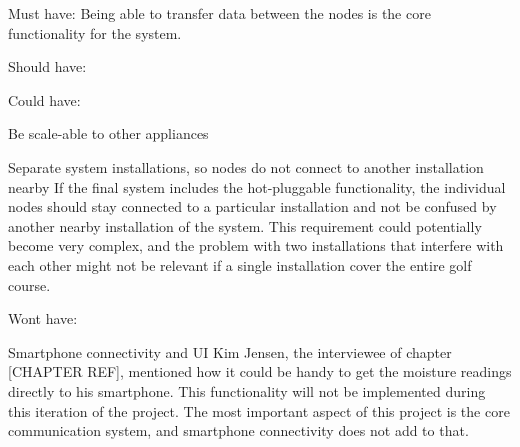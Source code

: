 
Must have:
Being able to transfer data between the nodes is the core functionality for the system.








Should have:



Could have:
\item Be scale-able to other appliances


\item Separate system installations, so nodes do not connect to another installation nearby
If the final system includes the hot-pluggable functionality, the individual nodes should stay connected to a particular installation and not be confused by another nearby installation of the system. This requirement could potentially become very complex, and the problem with two installations that interfere with each other might not be relevant if a single installation cover the entire golf course.


Wont have:
\item Smartphone connectivity and UI
Kim Jensen, the interviewee of chapter [CHAPTER REF], mentioned how it could be handy to get the moisture readings directly to his smartphone. This functionality will not be implemented during this iteration of the project. The most important aspect of this project is the core communication system, and smartphone connectivity does not add to that.








